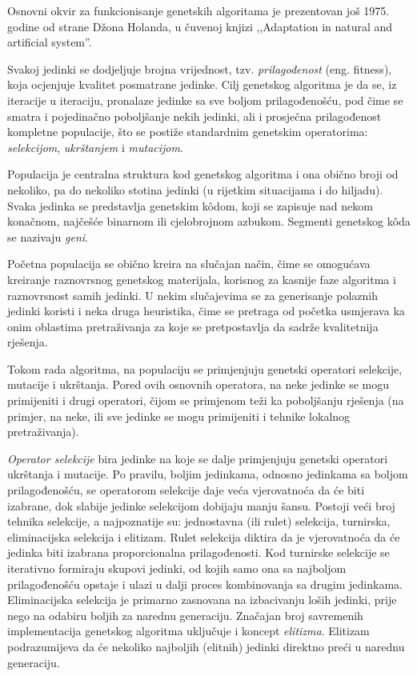 \documentclass[b5paper, utf8, 11pt, colorlinks]{book}
\theoremstyle{definition}
\begin{document}
 Osnovni okvir za funkcionisanje genetskih algoritama je prezentovan još 1975. godine od strane Džona Holanda, u čuvenoj knjizi ,,Adaptation in natural and artificial system''.
 
 Svakoj jedinki se dodjeljuje brojna vrijednost, tzv. \textit{prilagođenost} (eng.   {fitness}), koja ocjenjuje kvalitet posmatrane jedinke. Cilj genetskog algoritma je da se, iz iteracije u iteraciju, pronalaze jedinke sa sve boljom prilagođenošću, pod čime se smatra i pojedinačno poboljšanje nekih jedinki, ali i prosječna prilagođenost kompletne populacije, što se postiže standardnim genetskim operatorima: \textit{selekcijom}, \textit{ukrštanjem} i \textit{mutacijom}.
 
 Populacija je centralna struktura kod genetskog algoritma i ona  obično broji od nekoliko, pa do nekoliko stotina jedinki (u rijetkim situacijama i do hiljadu). Svaka jedinka se predstavlja genetskim k\^odom, koji se zapisuje nad nekom konačnom, najčešće binarnom ili  cjelobrojnom azbukom. Segmenti genetskog k\^oda se nazivaju \emph{geni}. 
 
 
 Početna populacija se obično kreira na slučajan način, čime se omogućava kreiranje raznovrsnog genetskog materijala, korisnog za kasnije faze algoritma i raznovrsnost samih jedinki. U nekim slučajevima se za generisanje polaznih jedinki koristi i neka druga heuristika, čime se pretraga od početka usmjerava ka onim oblastima pretraživanja za koje se pretpostavlja da sadrže kvalitetnija rješenja.
 
 Tokom rada algoritma, na populaciju se primjenjuju genetski operatori selekcije, mutacije i ukrštanja. Pored ovih osnovnih operatora, na neke jedinke se mogu primijeniti i drugi operatori, čijom se primjenom teži ka poboljšanju rješenja (na primjer, na neke, ili sve jedinke se mogu primijeniti i tehnike lokalnog  pretraživanja).
 
 \emph{Operator selekcije} bira jedinke na koje se dalje primjenjuju genetski operatori ukrštanja i mutacije. Po pravilu, boljim jedinkama, odnosno jedinkama sa boljom prilagođenošću, se operatorom selekcije daje veća vjerovatnoća da će biti izabrane, dok  slabije jedinke selekcijom dobijaju manju šansu. Postoji veći broj tehnika selekcije, a najpoznatije su: jednostavna (ili rulet) selekcija, turnirska, eliminacijska selekcija i elitizam. Rulet selekcija diktira da je vjerovatnoća da će jedinka biti izabrana proporcionalna prilagođenosti. Kod turnirske selekcije se iterativno formiraju skupovi jedinki, od kojih samo ona sa najboljom prilagođenošću opstaje i ulazi u dalji proces kombinovanja sa drugim jedinkama. Eliminacijska selekcija je primarno zasnovana na izbacivanju loših jedinki, prije nego na odabiru boljih za narednu generaciju. Značajan broj savremenih implementacija genetskog algoritma uključuje i koncept \emph{elitizma}. Elitizam podrazumijeva da će nekoliko najboljih (elitnih) jedinki direktno preći u narednu generaciju.
 
\end{document}
